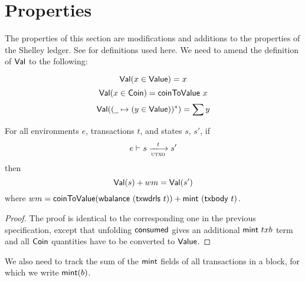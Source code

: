 \newcommand{\Val}{\fun{Val}}
\newcommand{\POV}[2]{\ensuremath{\mathsf{PresOfVal}(#1, \mathsf{#2})}}

\section{Properties}
\label{sec:properties}

The properties of this section are modifications and additions to the properties of the Shelley ledger. See \cite{shelley_spec} for definitions used here. We need to amend the definition of $\Val$ to the following:

\begin{equation*}
    \Val(x \in \Value) = x
\end{equation*}
\begin{equation*}
    \Val(x \in \Coin) = \fun{coinToValue}~x
\end{equation*}
\begin{equation*}
    \Val((\wcard\mapsto (y \in \Value))^{*}) = \sum y
\end{equation*}

\begin{lemma}
  \label{lemma:utxo-pres-of-value}
  For all environments $e$, transactions $t$, and states $s$, $s'$, if
  \begin{equation*}
    e\vdash s\trans{utxo}{t}s'
  \end{equation*}
  then
  \begin{equation*}
    \Val(s) + wm = \Val(s')
  \end{equation*}
  where $wm = \mathsf{coinToValue} (\mathsf{wbalance}~(\mathsf{txwdrls}~{t})) + \mathsf{mint}~(\mathsf{txbody}~{t})$.
\end{lemma}
\begin{proof}
  The proof is identical to the corresponding one in the previous
  specification, except that unfolding $\mathsf{consumed}$ gives an
  additional $\mathsf{mint}~{txb}$ term and all $\mathsf{Coin}$ quantities have
  to be converted to $\mathsf{Value}$.
\end{proof}

We also need to track the sum of the $\mathsf{mint}$ fields of all
transactions in a block, for which we write $\mathsf{mint}(b)$.

